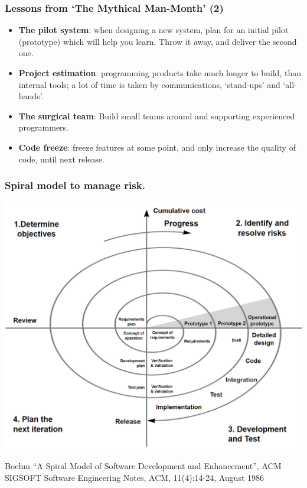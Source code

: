 \documentclass{beamer} %
\newcommand\emc[1]{\textcolor{midred}{\textbf{#1}}}
\begin{document}
\begin{frame}
\frametitle{Lessons from `The Mythical Man-Month' (2)}

\begin{itemize}
  \item \emc{The pilot system}: when designing a new system, plan for an initial pilot (prototype) which will help you learn. Throw it away, and deliver the second one.
  \item \emc{Project estimation}: programming products take much longer to build, than internal tools; a lot of time is taken by communications, `stand-ups' and `all-hands'.
  \item \emc{The surgical team}: Build small teams around and supporting experienced programmers.
  \item \emc{Code freeze}: freeze features at some point, and only increase the quality of code, until next release.
\end{itemize}

\end{frame}

\begin{frame}
\frametitle{Spiral model to manage risk.}

\begin{center}
\includegraphics[scale=0.27]{assets/spiral}
\end{center}

{\small Boehm ``A Spiral Model of Software Development and Enhancement'', ACM SIGSOFT Software Engineering Notes, ACM, 11(4):14-24, August 1986}

\end{frame}
\end{document}
